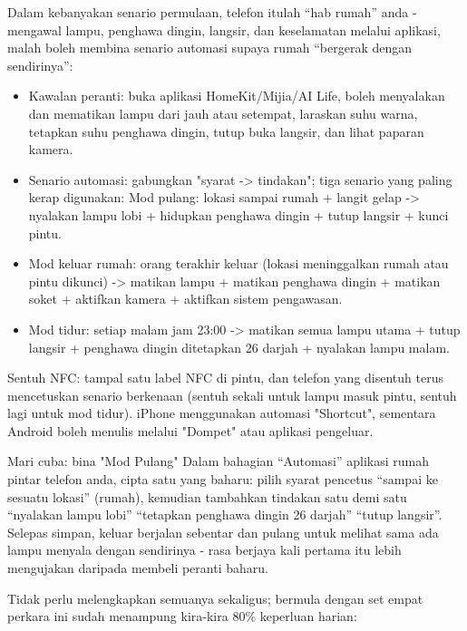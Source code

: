 
Dalam kebanyakan senario permulaan, telefon itulah “hab rumah” anda - mengawal lampu, penghawa dingin, langsir, dan keselamatan melalui aplikasi, malah boleh membina senario automasi supaya rumah “bergerak dengan sendirinya”:

\begin{itemize}
  \item Kawalan peranti: buka aplikasi HomeKit/Mijia/AI Life, boleh menyalakan dan mematikan lampu dari jauh atau setempat, laraskan suhu warna, tetapkan suhu penghawa dingin, tutup buka langsir, dan lihat paparan kamera.
  \item Senario automasi: gabungkan "syarat -> tindakan"; tiga senario yang paling kerap digunakan: Mod pulang: lokasi sampai rumah + langit gelap -> nyalakan lampu lobi + hidupkan penghawa dingin + tutup langsir + kunci pintu.
  \item Mod keluar rumah: orang terakhir keluar (lokasi meninggalkan rumah atau pintu dikunci) -> matikan lampu + matikan penghawa dingin + matikan soket + aktifkan kamera + aktifkan sistem pengawasan.
  \item Mod tidur: setiap malam jam 23:00 -> matikan semua lampu utama + tutup langsir + penghawa dingin ditetapkan 26 darjah + nyalakan lampu malam.
\end{itemize}

Sentuh NFC: tampal satu label NFC di pintu, dan telefon yang disentuh terus mencetuskan senario berkenaan (sentuh sekali untuk lampu masuk pintu, sentuh lagi untuk mod tidur). iPhone menggunakan automasi "Shortcut", sementara Android boleh menulis melalui "Dompet" atau aplikasi pengeluar.

\begin{tcbpractice}{Mari cuba: bina "Mod Pulang"}
Dalam bahagian “Automasi” aplikasi rumah pintar telefon anda, cipta satu yang baharu: pilih syarat pencetus “sampai ke sesuatu lokasi” (rumah), kemudian tambahkan tindakan satu demi satu “nyalakan lampu lobi” “tetapkan penghawa dingin 26 darjah” “tutup langsir”. Selepas simpan, keluar berjalan sebentar dan pulang untuk melihat sama ada lampu menyala dengan sendirinya - rasa berjaya kali pertama itu lebih mengujakan daripada membeli peranti baharu.

\end{tcbpractice}


Tidak perlu melengkapkan semuanya sekaligus; bermula dengan set empat perkara ini sudah menampung kira-kira 80\% keperluan harian:

